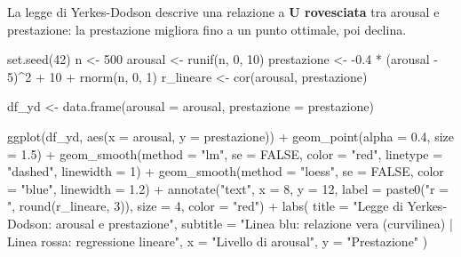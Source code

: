\documentclass[
  italian,
  letterpaper,
  a4paper,
  11pt,
  open=any]{scrbook}
\newenvironment{Shaded}{\begin{snugshade}}{\end{snugshade}}
\newcommand{\AttributeTok}[1]{\textcolor[rgb]{0.40,0.45,0.13}{#1}}
\newcommand{\ConstantTok}[1]{\textcolor[rgb]{0.56,0.35,0.01}{#1}}
\newcommand{\DecValTok}[1]{\textcolor[rgb]{0.68,0.00,0.00}{#1}}
\newcommand{\FloatTok}[1]{\textcolor[rgb]{0.68,0.00,0.00}{#1}}
\newcommand{\FunctionTok}[1]{\textcolor[rgb]{0.28,0.35,0.67}{#1}}
\newcommand{\NormalTok}[1]{\textcolor[rgb]{0.00,0.23,0.31}{#1}}
\newcommand{\OtherTok}[1]{\textcolor[rgb]{0.00,0.23,0.31}{#1}}
\newcommand{\SpecialCharTok}[1]{\textcolor[rgb]{0.37,0.37,0.37}{#1}}
\newcommand{\StringTok}[1]{\textcolor[rgb]{0.13,0.47,0.30}{#1}}
\theoremstyle{plain}
\theoremstyle{definition}
\theoremstyle{definition}
\theoremstyle{remark}
\begin{document}
La legge di Yerkes-Dodson descrive una relazione a \textbf{U rovesciata}
tra arousal e prestazione: la prestazione migliora fino a un punto
ottimale, poi declina.

\begin{Shaded}
\begin{Highlighting}[]
\FunctionTok{set.seed}\NormalTok{(}\DecValTok{42}\NormalTok{)}
\NormalTok{n }\OtherTok{\textless{}{-}} \DecValTok{500}
\NormalTok{arousal }\OtherTok{\textless{}{-}} \FunctionTok{runif}\NormalTok{(n, }\DecValTok{0}\NormalTok{, }\DecValTok{10}\NormalTok{)}
\NormalTok{prestazione }\OtherTok{\textless{}{-}} \SpecialCharTok{{-}}\FloatTok{0.4} \SpecialCharTok{*}\NormalTok{ (arousal }\SpecialCharTok{{-}} \DecValTok{5}\NormalTok{)}\SpecialCharTok{\^{}}\DecValTok{2} \SpecialCharTok{+} \DecValTok{10} \SpecialCharTok{+} \FunctionTok{rnorm}\NormalTok{(n, }\DecValTok{0}\NormalTok{, }\DecValTok{1}\NormalTok{)}
\NormalTok{r\_lineare }\OtherTok{\textless{}{-}} \FunctionTok{cor}\NormalTok{(arousal, prestazione)}

\NormalTok{df\_yd }\OtherTok{\textless{}{-}} \FunctionTok{data.frame}\NormalTok{(}\AttributeTok{arousal =}\NormalTok{ arousal, }\AttributeTok{prestazione =}\NormalTok{ prestazione)}

\FunctionTok{ggplot}\NormalTok{(df\_yd, }\FunctionTok{aes}\NormalTok{(}\AttributeTok{x =}\NormalTok{ arousal, }\AttributeTok{y =}\NormalTok{ prestazione)) }\SpecialCharTok{+}
  \FunctionTok{geom\_point}\NormalTok{(}\AttributeTok{alpha =} \FloatTok{0.4}\NormalTok{, }\AttributeTok{size =} \FloatTok{1.5}\NormalTok{) }\SpecialCharTok{+}
  \FunctionTok{geom\_smooth}\NormalTok{(}\AttributeTok{method =} \StringTok{"lm"}\NormalTok{, }\AttributeTok{se =} \ConstantTok{FALSE}\NormalTok{, }\AttributeTok{color =} \StringTok{"red"}\NormalTok{, }
              \AttributeTok{linetype =} \StringTok{"dashed"}\NormalTok{, }\AttributeTok{linewidth =} \DecValTok{1}\NormalTok{) }\SpecialCharTok{+}
  \FunctionTok{geom\_smooth}\NormalTok{(}\AttributeTok{method =} \StringTok{"loess"}\NormalTok{, }\AttributeTok{se =} \ConstantTok{FALSE}\NormalTok{, }\AttributeTok{color =} \StringTok{"blue"}\NormalTok{, }\AttributeTok{linewidth =} \FloatTok{1.2}\NormalTok{) }\SpecialCharTok{+}
  \FunctionTok{annotate}\NormalTok{(}\StringTok{"text"}\NormalTok{, }\AttributeTok{x =} \DecValTok{8}\NormalTok{, }\AttributeTok{y =} \DecValTok{12}\NormalTok{, }
           \AttributeTok{label =} \FunctionTok{paste0}\NormalTok{(}\StringTok{"r = "}\NormalTok{, }\FunctionTok{round}\NormalTok{(r\_lineare, }\DecValTok{3}\NormalTok{)), }
           \AttributeTok{size =} \DecValTok{4}\NormalTok{, }\AttributeTok{color =} \StringTok{"red"}\NormalTok{) }\SpecialCharTok{+}
  \FunctionTok{labs}\NormalTok{(}
    \AttributeTok{title =} \StringTok{"Legge di Yerkes{-}Dodson: arousal e prestazione"}\NormalTok{,}
    \AttributeTok{subtitle =} \StringTok{"Linea blu: relazione vera (curvilinea) | Linea rossa: regressione lineare"}\NormalTok{,}
    \AttributeTok{x =} \StringTok{"Livello di arousal"}\NormalTok{,}
    \AttributeTok{y =} \StringTok{"Prestazione"}
\NormalTok{  )}
\end{Highlighting}
\end{Shaded}
\end{document}
